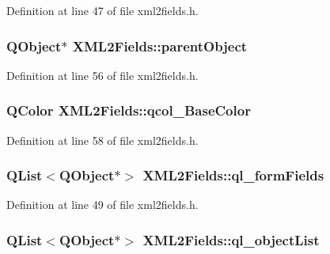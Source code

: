 Definition at line 47 of file xml2fields.h.

\hypertarget{classXML2Fields_a2cf56baac7b4559ba2aca1af32279d26}{
\subsubsection[{parentObject}]{\setlength{\rightskip}{0pt plus 5cm}QObject$\ast$ {\bf XML2Fields::parentObject}}}
\label{classXML2Fields_a2cf56baac7b4559ba2aca1af32279d26}


Definition at line 56 of file xml2fields.h.

\hypertarget{classXML2Fields_a33cfcfe4863357bceb94ac279120925a}{
\subsubsection[{qcol\_\-BaseColor}]{\setlength{\rightskip}{0pt plus 5cm}QColor {\bf XML2Fields::qcol\_\-BaseColor}}}
\label{classXML2Fields_a33cfcfe4863357bceb94ac279120925a}


Definition at line 58 of file xml2fields.h.

\hypertarget{classXML2Fields_ae92aef70643deee1737b7fc0096735f6}{
\subsubsection[{ql\_\-formFields}]{\setlength{\rightskip}{0pt plus 5cm}QList$<$QObject$\ast$$>$ {\bf XML2Fields::ql\_\-formFields}}}
\label{classXML2Fields_ae92aef70643deee1737b7fc0096735f6}


Definition at line 49 of file xml2fields.h.

\hypertarget{classXML2Fields_ac3f7050cd12bcb4c6a187f419a0f03bb}{
\subsubsection[{ql\_\-objectList}]{\setlength{\rightskip}{0pt plus 5cm}QList$<$QObject$\ast$$>$ {\bf XML2Fields::ql\_\-objectList}}}
\label{classXML2Fields_ac3f7050cd12bcb4c6a187f419a0f03bb}


